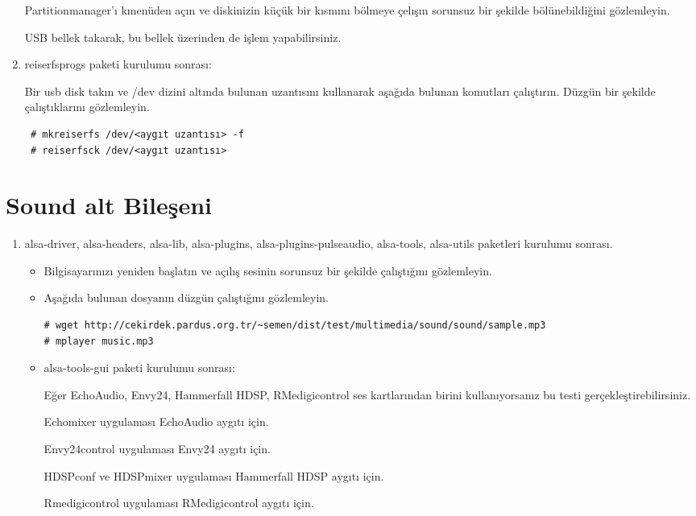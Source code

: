 \documentclass[a4paper,10pt]{article}
\begin{document}
\begin{enumerate}
Partitionmanager'ı kmenüden açın ve diskinizin küçük bir kısmını bölmeye çelışın sorunsuz bir şekilde bölünebildiğini gözlemleyin.

USB bellek takarak, bu bellek üzerinden de işlem yapabilirsiniz.

\item reiserfsprogs paketi kurulumu sonrası:

Bir usb disk takın ve /dev dizini altında bulunan uzantısını kullanarak aşağıda bulunan komutları çalıştırın. Düzgün bir şekilde çalıştıklarını gözlemleyin. 

\begin{verbatim}
 # mkreiserfs /dev/<aygıt uzantısı> -f
 # reiserfsck /dev/<aygıt uzantısı>
\end{verbatim}

\end{enumerate}
\section{Sound alt Bileşeni}
\begin{enumerate}
 \item alsa-driver, alsa-headers, alsa-lib, alsa-plugins, alsa-plugins-pulseaudio, alsa-tools, alsa-utils paketleri kurulumu sonrası.
\begin{itemize}
 \item Bilgisayarınızı yeniden başlatın ve açılış sesinin sorunsuz bir şekilde çalıştığını gözlemleyin.
 \item Aşağıda bulunan dosyanın düzgün çalıştığını gözlemleyin.
\begin{verbatim}
# wget http://cekirdek.pardus.org.tr/~semen/dist/test/multimedia/sound/sound/sample.mp3
# mplayer music.mp3
\end{verbatim}

\item alsa-tools-gui paketi kurulumu sonrası:

Eğer  EchoAudio, Envy24, Hammerfall HDSP, RMedigicontrol ses kartlarından birini kullanıyorsanız bu testi gerçekleştirebilirsiniz.

Echomixer uygulaması EchoAudio aygıtı için.

Envy24control uygulaması Envy24 aygıtı için.

HDSPconf ve HDSPmixer uygulaması Hammerfall HDSP aygıtı için.

Rmedigicontrol uygulaması RMedigicontrol aygıtı için.
\end{itemize}


\end{enumerate}
\end{document}
